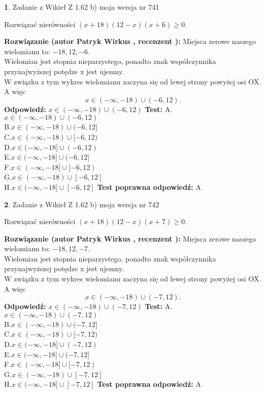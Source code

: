 \documentclass[12pt, a4paper]{article}
\theoremstyle{definition} %
\newtheorem{zad}{}
\newcommand{\zadStart}[1]{\begin{zad}#1\newline}
\newcommand{\zadStop}{\end{zad}}
\newcommand{\rozwStart}[2]{\noindent \textbf{Rozwiązanie (autor #1 , recenzent #2): }\newline}
\newcommand{\rozwStop}{\newline}
\newcommand{\odpStart}{\noindent \textbf{Odpowiedź:}\newline}
\newcommand{\odpStop}{\newline}
\newcommand{\testStart}{\noindent \textbf{Test:}\newline}
\newcommand{\testStop}{\newline}
\newcommand{\kluczStart}{\noindent \textbf{Test poprawna odpowiedź:}\newline}
\newcommand{\kluczStop}{\newline}
\begin{document}
\zadStart{Zadanie z Wikieł Z 1.62 b) moja wersja nr 741}

Rozwiązać nierówności $(x+18)(12-x)(x+6)\ge0$.
\zadStop
\rozwStart{Patryk Wirkus}{}
Miejsca zerowe naszego wielomianu to: $-18, 12, -6$.\\
Wielomian jest stopnia nieparzystego, ponadto znak współczynnika przy\linebreak najwyższej potędze x jest ujemny.\\ W związku z tym wykres wielomianu zaczyna się od lewej strony powyżej osi OX. A więc $$x \in (-\infty,-18) \cup (-6,12).$$
\rozwStop
\odpStart
$x \in (-\infty,-18) \cup (-6,12)$
\odpStop
\testStart
A.$x \in (-\infty,-18) \cup (-6,12)$\\
B.$x \in (-\infty,-18) \cup (-6,12]$\\
C.$x \in (-\infty,-18) \cup [-6,12)$\\
D.$x \in (-\infty,-18] \cup (-6,12)$\\
E.$x \in (-\infty,-18] \cup (-6,12]$\\
F.$x \in (-\infty,-18] \cup [-6,12)$\\
G.$x \in (-\infty,-18) \cup [-6,12]$\\
H.$x \in (-\infty,-18] \cup [-6,12]$
\testStop
\kluczStart
A
\kluczStop



\zadStart{Zadanie z Wikieł Z 1.62 b) moja wersja nr 742}

Rozwiązać nierówności $(x+18)(12-x)(x+7)\ge0$.
\zadStop
\rozwStart{Patryk Wirkus}{}
Miejsca zerowe naszego wielomianu to: $-18, 12, -7$.\\
Wielomian jest stopnia nieparzystego, ponadto znak współczynnika przy\linebreak najwyższej potędze x jest ujemny.\\ W związku z tym wykres wielomianu zaczyna się od lewej strony powyżej osi OX. A więc $$x \in (-\infty,-18) \cup (-7,12).$$
\rozwStop
\odpStart
$x \in (-\infty,-18) \cup (-7,12)$
\odpStop
\testStart
A.$x \in (-\infty,-18) \cup (-7,12)$\\
B.$x \in (-\infty,-18) \cup (-7,12]$\\
C.$x \in (-\infty,-18) \cup [-7,12)$\\
D.$x \in (-\infty,-18] \cup (-7,12)$\\
E.$x \in (-\infty,-18] \cup (-7,12]$\\
F.$x \in (-\infty,-18] \cup [-7,12)$\\
G.$x \in (-\infty,-18) \cup [-7,12]$\\
H.$x \in (-\infty,-18] \cup [-7,12]$
\testStop
\kluczStart
A
\kluczStop
\end{document}

